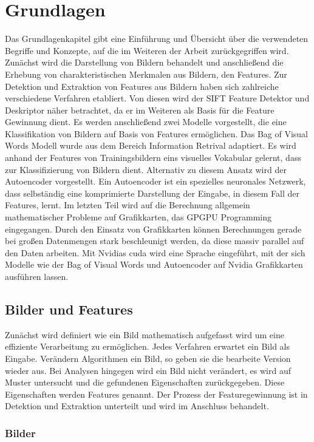 \chapter{Grundlagen}

Das Grundlagenkapitel gibt eine Einführung und Übersicht über die verwendeten Begriffe und Konzepte, auf die im Weiteren der Arbeit zurückgegriffen wird. Zunächst wird die Darstellung von Bildern behandelt und anschließend die Erhebung von charakteristischen Merkmalen aus Bildern, den Features. Zur Detektion und Extraktion von Features aus Bildern haben sich zahlreiche verschiedene Verfahren etabliert. Von diesen wird der SIFT Feature Detektor und Deskriptor näher betrachtet, da er im Weiteren als Basis für die Feature Gewinnung dient. 
Es werden anschließend zwei Modelle vorgestellt, die eine Klassifikation von Bildern auf Basis von Features ermöglichen. Das Bag of Visual Words Modell wurde aus dem Bereich Information Retrival adaptiert. Es wird anhand der Features von Trainingsbildern eins visuelles Vokabular gelernt, dass zur Klassifizierung von Bildern dient. Alternativ zu diesem Ansatz wird der Autoencoder vorgestellt. Ein Autoencoder ist ein spezielles neuronales Netzwerk, dass selbständig eine komprimierte Darstellung der Eingabe, in diesem Fall der Features, lernt. 
Im letzten Teil wird auf die Berechnung allgemein mathematischer Probleme auf Grafikkarten, das GPGPU Programming eingegangen. Durch den Einsatz von Grafikkarten können Berechnungen gerade bei großen Datenmengen stark beschleunigt werden, da diese massiv parallel auf den Daten arbeiten. Mit Nvidias cuda wird eine Sprache eingeführt, mit der sich Modelle wie der Bag of Visual Words und Autoencoder auf Nvidia Grafikkarten ausführen lassen.

\section{Bilder und Features}

Zunächst wird definiert wie ein Bild mathematisch aufgefasst wird um eine effiziente Verarbeitung zu ermöglichen. Jedes Verfahren erwartet ein Bild als Eingabe. Verändern Algorithmen ein Bild, so geben sie die bearbeite Version wieder aus. Bei Analysen hingegen wird ein Bild nicht verändert, es wird auf Muster untersucht und die gefundenen Eigenschaften zurückgegeben. Diese Eigenschaften werden Features genannt. Der Prozess der Featuregewinnung ist in Detektion und Extraktion unterteilt und wird im Anschluss behandelt.

\subsection{Bilder}

